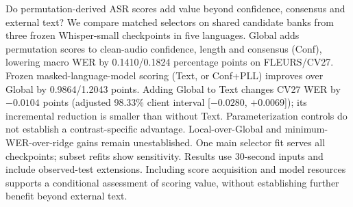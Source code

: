 Do permutation-derived ASR scores add value beyond confidence, consensus and external text? We compare matched selectors on shared candidate banks from three frozen Whisper-small checkpoints in five languages. Global adds permutation scores to clean-audio confidence, length and consensus (Conf), lowering macro WER by 0.1410/0.1824 percentage points on FLEURS/CV27. Frozen masked-language-model scoring (Text, or Conf+PLL) improves over Global by 0.9864/1.2043 points. Adding Global to Text changes CV27 WER by $-0.0104$ points (adjusted 98.33\% client interval [$-0.0280$, $+0.0069$]); its incremental reduction is smaller than without Text. Parameterization controls do not establish a contrast-specific advantage. Local-over-Global and minimum-WER-over-ridge gains remain unestablished. One main selector fit serves all checkpoints; subset refits show sensitivity. Results use 30-second inputs and include observed-test extensions. Including score acquisition and model resources supports a conditional assessment of scoring value, without establishing further benefit beyond external text.

